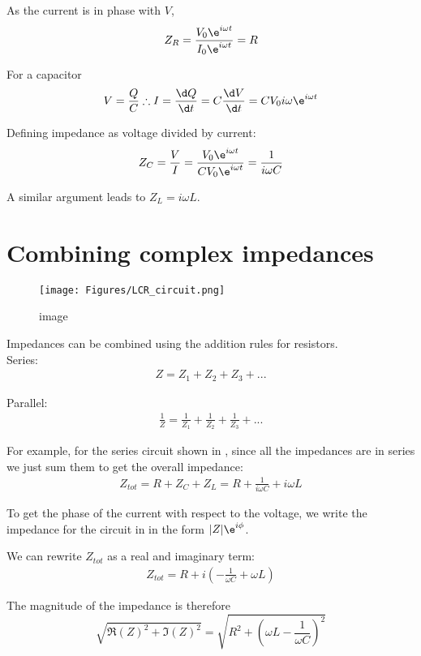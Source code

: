 \documentclass[
]{book}
\theoremstyle{definition}
\theoremstyle{definition}
\theoremstyle{definition}
\theoremstyle{definition}
\theoremstyle{remark}
\begin{document}
As the current is in phase with \(V\),
\[Z_R = \frac{V_0 \e^{i\omega t} }{ I_0 \e^{i\omega t}} = R\]

For a capacitor
\[V = \frac{Q}{C} \therefore I = \frac{\d Q}{\d t} = C \frac{\d V}{\d t} = C V_0 i \omega \e^{i\omega t}\]

Defining impedance as voltage divided by current:
\[Z_C = \frac{V}{I} = \frac{V_0 \e^{i\omega t} }{C V_0 \e^{i\omega t}} = \frac{1}{i\omega C}\]

A similar argument leads to \(Z_L = i\omega L\).

\hypertarget{combining-complex-impedances}{%
\section{Combining complex impedances}\label{combining-complex-impedances}}

\begin{figure}
\centering
\texttt{[image: Figures/LCR\_circuit.png]}
\caption{image}
\end{figure}

Impedances can be combined using the addition rules for resistors.\\
Series: \[\begin{aligned}
 Z = Z_1 + Z_2 + Z_3 + ...
\end{aligned}\]

Parallel: \[\begin{aligned}
\frac{1}{Z} = \frac{1}{Z_1} + \frac{1}{Z_2} + \frac{1}{Z_3} + ...
\end{aligned}\]

For example, for the series circuit shown in , since all the impedances
are in series we just sum them to get the overall impedance:
\[\begin{aligned}
Z_{tot} = R + Z_C + Z_L = R + \frac{1}{i\omega C} + i\omega L
\end{aligned}\]

To get the phase of the current with respect to the voltage, we write
the impedance for the circuit in in the form \(|Z| \e^{i\phi}\).

We can rewrite \(Z_{tot}\) as a real and imaginary term: \[\begin{aligned}
Z_{tot} = R + i\left( - \frac{1}{\omega C} + \omega L \right) 
\end{aligned}\]

The magnitude of the impedance is therefore
\[\sqrt{ \Re(Z)^2 + \Im(Z)^2 } = \sqrt{ R^2 + \left( \omega L - \frac{1}{\omega C} \right)^2 }\]
\end{document}
